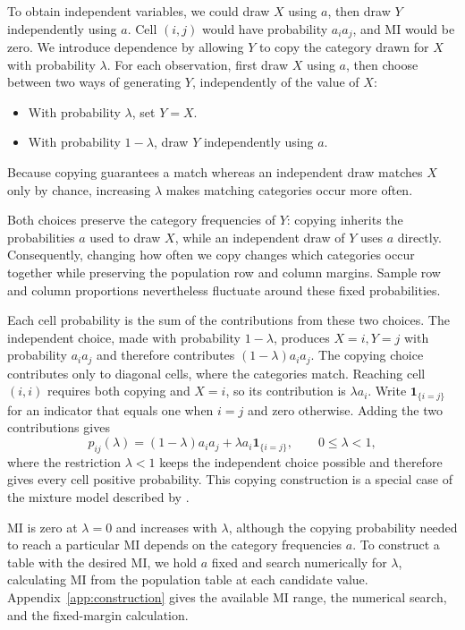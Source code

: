 To obtain independent variables, we could draw \(X\) using \(a\), then
draw \(Y\) independently using \(a\). Cell \((i,j)\) would have
probability \(a_i a_j\), and MI would be zero. We introduce dependence by allowing \(Y\) to copy the category drawn
for \(X\) with probability \(\lambda\). For each
observation, first draw \(X\) using \(a\), then choose between two ways
of generating \(Y\), independently of the value of \(X\):
\begin{itemize}
 \item With probability \(\lambda\), set \(Y=X\).
 \item With probability \(1-\lambda\), draw \(Y\) independently using \(a\).
\end{itemize}
Because copying guarantees a match whereas an independent draw matches
\(X\) only by chance, increasing \(\lambda\) makes matching categories
occur more often.

Both choices preserve the category frequencies of \(Y\): copying
inherits the probabilities \(a\) used to draw \(X\), while an
independent draw of \(Y\) uses \(a\) directly. Consequently, changing how
often we copy changes which categories occur together while preserving the
population row and column margins. Sample row and column proportions
nevertheless fluctuate around these fixed probabilities.

Each cell probability is the sum of the contributions from these two
choices. The independent choice, made with probability \(1-\lambda\),
produces \(X=i,Y=j\) with probability \(a_i a_j\) and therefore
contributes \((1-\lambda)a_i a_j\). The copying choice contributes only to diagonal
cells, where the categories match. Reaching cell \((i,i)\) requires both
copying and \(X=i\), so its contribution is \(\lambda a_i\).
Write \(\mathbf{1}_{\{i=j\}}\) for an indicator that equals one when
\(i=j\) and zero otherwise. Adding the two contributions gives
\begin{equation}
 p_{ij}(\lambda)=(1-\lambda)a_i a_j
                  +\lambda a_i\mathbf{1}_{\{i=j\}},
 \qquad 0\leq\lambda<1,
 \label{eq:copying-construction}
\end{equation}
where the restriction \(\lambda<1\) keeps the independent choice possible
and therefore gives every cell positive probability. This copying
construction is a special case of the mixture model described by
\citet{bocci2010}.

MI is zero at \(\lambda=0\) and increases with \(\lambda\),
although the copying probability needed to reach a particular MI depends
on the category frequencies \(a\). To construct a table with the desired
MI, we hold \(a\) fixed and search numerically for \(\lambda\),
calculating MI from the population table at each candidate value.
Appendix~\ref{app:construction} gives the available MI range, the numerical
search, and the fixed-margin calculation.

